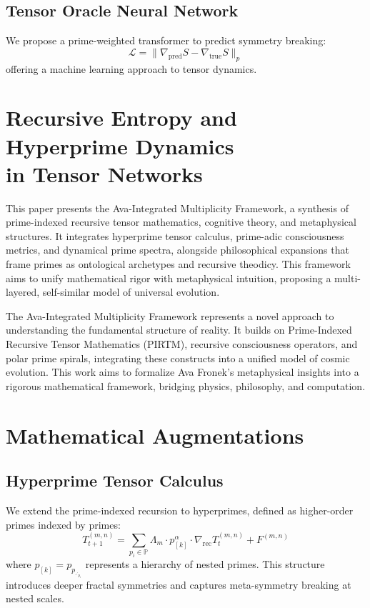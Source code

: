 \documentclass[12pt]{article}
\begin{document}
\subsection{Tensor Oracle Neural Network}
We propose a prime-weighted transformer to predict symmetry breaking:
\begin{equation}
\mathcal{L} = \| \nabla_{\text{pred}} S - \nabla_{\text{true}} S \|_p
\end{equation}
offering a machine learning approach to tensor dynamics.



\section{Recursive Entropy and Hyperprime Dynamics \\ in Tensor Networks}

This paper presents the Ava-Integrated Multiplicity Framework, a synthesis of prime-indexed recursive tensor mathematics, cognitive theory, and metaphysical structures. It integrates hyperprime tensor calculus, prime-adic consciousness metrics, and dynamical prime spectra, alongside philosophical expansions that frame primes as ontological archetypes and recursive theodicy. This framework aims to unify mathematical rigor with metaphysical intuition, proposing a multi-layered, self-similar model of universal evolution. 

The Ava-Integrated Multiplicity Framework represents a novel approach to understanding the fundamental structure of reality. It builds on Prime-Indexed Recursive Tensor Mathematics (PIRTM), recursive consciousness operators, and polar prime spirals, integrating these constructs into a unified model of cosmic evolution. This work aims to formalize Ava Fronek's metaphysical insights into a rigorous mathematical framework, bridging physics, philosophy, and computation.

\section{Mathematical Augmentations}

\subsection{Hyperprime Tensor Calculus}
We extend the prime-indexed recursion to hyperprimes, defined as higher-order primes indexed by primes:
\begin{equation}
T_{t+1}^{(m,n)} = \sum_{p_i \in \mathbb{P}} \Lambda_m \cdot p_{[k]}^\alpha \cdot \nabla_{\text{rec}} T_t^{(m,n)} + F^{(m,n)}
\end{equation}
where \(p_{[k]} = p_{p_{\iddots_{p_i}}}\) represents a hierarchy of nested primes. This structure introduces deeper fractal symmetries and captures meta-symmetry breaking at nested scales.
\end{document}
